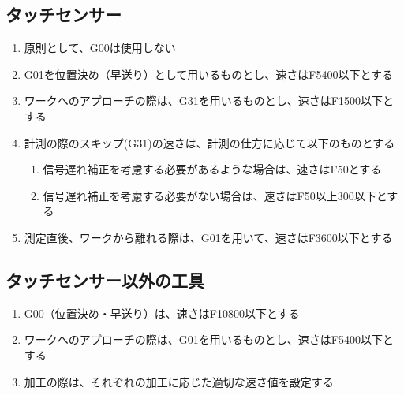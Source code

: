 \subsection{タッチセンサー}
\begin{enumerate}
\item 原則として、G00は使用しない
\item G01を位置決め（早送り）として用いるものとし、速さはF5400以下とする
\item ワークへのアプローチの際は、G31を用いるものとし、速さはF1500以下とする
\item 計測の際のスキップ(G31)の速さは、計測の仕方に応じて以下のものとする
  \begin{enumerate}
  \item 信号遅れ補正を考慮する必要があるような場合は、速さはF50とする
  \item 信号遅れ補正を考慮する必要がない場合は、速さはF50以上300以下とする
  \end{enumerate}
\item 測定直後、ワークから離れる際は、G01を用いて、速さはF3600以下とする
\end{enumerate}




\subsection{タッチセンサー以外の工具}
\begin{enumerate}
\item G00（位置決め・早送り）は、速さはF10800以下とする
\item ワークへのアプローチの際は、G01を用いるものとし、速さはF5400以下とする
\item 加工の際は、それぞれの加工に応じた適切な速さ値を設定する
\end{enumerate}
